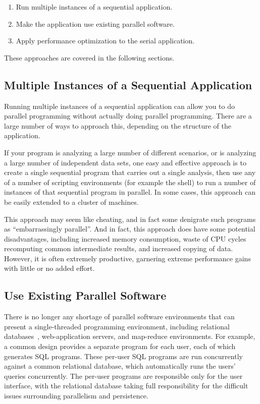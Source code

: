 \begin{enumerate}
\item	Run multiple instances of a sequential application.
\item	Make the application use existing parallel software.
\item	Apply performance optimization to the serial application.
\end{enumerate}

These approaches are covered in the following sections.

\subsection{Multiple Instances of a Sequential Application}
\label{sec:intro:Multiple Instances of a Sequential Application}

Running multiple instances of a sequential application can allow you
to do parallel programming without actually doing parallel programming.
There are a large number of ways to approach this, depending on the
structure of the application.

If your program is analyzing a large number of different scenarios,
or is analyzing a large number of independent data sets, one easy
and effective approach is to create a single sequential program that
carries out a single analysis, then use any of a number of scripting
environments (for example the  shell) to run a number of
instances of that sequential program in parallel.
In some cases, this approach can be easily extended to a cluster of
machines.

This approach may seem like cheating, and in fact some denigrate such
programs as ``embarrassingly parallel''.
And in fact, this approach does have some potential disadvantages,
including increased memory consumption, waste of CPU cycles recomputing
common intermediate results, and increased copying of data.
However, it is often  extremely productive, garnering extreme performance
gains with little or no added effort.

\subsection{Use Existing Parallel Software}
\label{sec:intro:Use Existing Parallel Software}

There is no longer any shortage of parallel software environments that
can present a single-threaded programming environment,
including relational
databases~\cite{Date82},
web-application servers, and map-reduce environments.
For example, a common design provides a separate program for each
user, each of which generates SQL programs.
These per-user SQL programs are run concurrently against a common
relational database, which automatically runs the users' queries concurrently.
The per-user programs are responsible only for the user interface,
with the relational database taking full responsibility for the
difficult issues surrounding parallelism and persistence.

